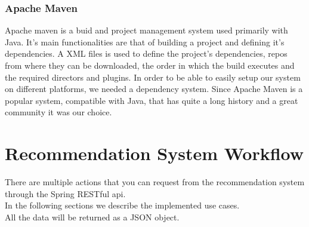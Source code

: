 \lstset{caption=Stanford Core NLP lemmatizer code, label=lst:stanford-core-nlp}


\subsubsection{Apache Maven}
\label{sec:frameworks-apache-maven}
Apache maven is a buid and project management system used primarily with Java. It's main functionalities are that of building a project and defining it's dependencies. A XML files is used to define the project's dependencies, repos from where they can be downloaded, the order in which the build executes and the required directors and plugins.
In order to be able to easily setup our system on different platforms, we needed a dependency system. Since Apache Maven is a popular system, compatible with Java, that has quite a long history and a great community it was our choice.

\section{Recommendation System Workflow} 
\label{sec:workflow}
There are multiple actions that you can request from the recommendation system through the Spring RESTful api.
\\ In the following sections we describe the implemented use cases.
\\ All the data will be returned as a JSON object.

\hfill \break
\hfill \break
\hfill \break
\hfill \break

